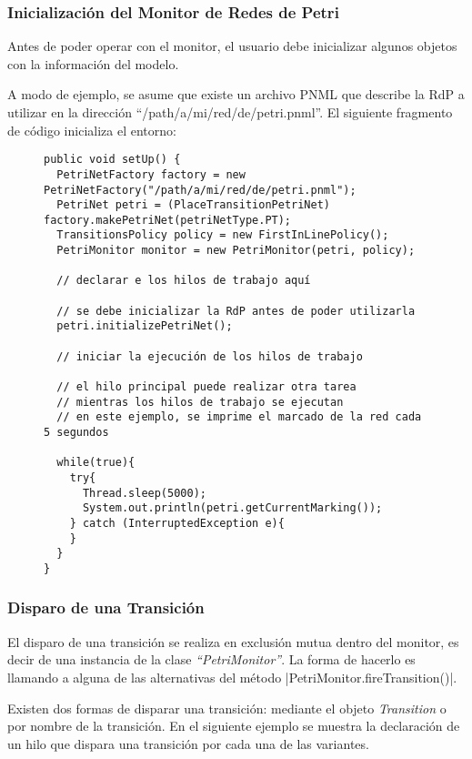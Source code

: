 \subsubsection{Inicialización del Monitor de Redes de Petri}

Antes de poder operar con el monitor, el usuario debe inicializar algunos
objetos con la información del modelo.

A modo de ejemplo, se asume que existe un archivo PNML que describe la RdP a
utilizar en la dirección ``/path/a/mi/red/de/petri.pnml''. El siguiente
fragmento de código inicializa  el entorno:

\begin{figure}[H]
\centering
\begin{verbatim}
public void setUp() {
  PetriNetFactory factory = new PetriNetFactory("/path/a/mi/red/de/petri.pnml");
  PetriNet petri = (PlaceTransitionPetriNet) factory.makePetriNet(petriNetType.PT);
  TransitionsPolicy policy = new FirstInLinePolicy();
  PetriMonitor monitor = new PetriMonitor(petri, policy);
  
  // declarar e los hilos de trabajo aquí
  
  // se debe inicializar la RdP antes de poder utilizarla
  petri.initializePetriNet();
  
  // iniciar la ejecución de los hilos de trabajo
  
  // el hilo principal puede realizar otra tarea
  // mientras los hilos de trabajo se ejecutan
  // en este ejemplo, se imprime el marcado de la red cada 5 segundos
  
  while(true){
    try{
      Thread.sleep(5000);
      System.out.println(petri.getCurrentMarking());
    } catch (InterruptedException e){
    }
  }
}
\end{verbatim}
\end{figure}

\subsubsection{Disparo de una Transición}

El disparo de una transición se realiza en exclusión mutua dentro del monitor,
es decir de una instancia de la clase \textit{``PetriMonitor''}. La forma de
hacerlo es llamando a alguna de las alternativas del método
|PetriMonitor.fireTransition()|.

Existen dos formas de disparar una transición: mediante el objeto
\textit{Transition} o por nombre de la transición.
En el siguiente ejemplo se muestra la declaración de un hilo que dispara una
transición por cada una de las variantes.

